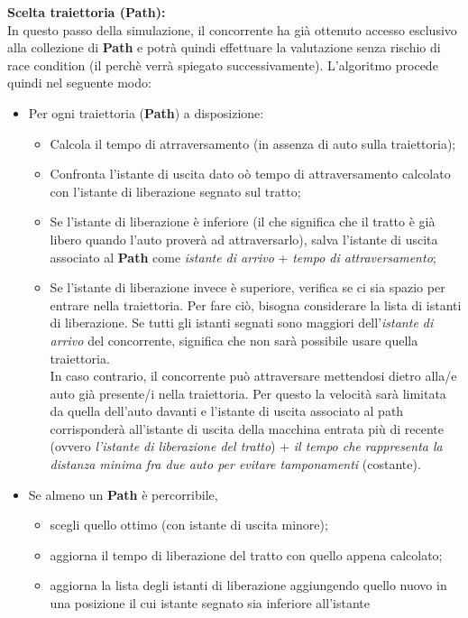 \begin{description}
\item{\textbf{Scelta traiettoria (Path):}}\\
In questo passo della simulazione, il concorrente ha già ottenuto accesso esclusivo alla collezione di \textbf{Path} e potrà quindi
effettuare la valutazione senza rischio di race condition (il perchè verrà spiegato successivamente). L'algoritmo procede quindi nel
seguente modo:
\begin{itemize}
\item Per ogni traiettoria (\textbf{Path}) a disposizione:
\begin{itemize}
\item Calcola il tempo di atrraversamento (in assenza di auto sulla traiettoria);
\item Confronta l'istante di uscita dato oò tempo di attraversamento calcolato con l'istante di liberazione
segnato sul tratto;
\item Se l'istante di liberazione è inferiore (il che significa che il tratto è già libero quando l'auto proverà ad attraversarlo),
salva l'istante di uscita associato al \textbf{Path} come \emph{istante di arrivo} + \emph{tempo di attraversamento};
\item Se l'istante di liberazione invece è superiore, verifica se ci sia spazio per entrare nella traiettoria. Per fare ciò, bisogna considerare
la lista di istanti di liberazione. Se tutti gli istanti segnati sono maggiori dell'\emph{istante di arrivo} del concorrente, significa che 
non sarà possibile usare quella traiettoria.\\
In caso contrario, il concorrente può attraversare mettendosi dietro alla/e auto già presente/i nella traiettoria. Per questo la velocità
sarà limitata da quella dell'auto davanti e l'istante di uscita associato al path 
corrisponderà all'istante di uscita della macchina entrata più di recente (ovvero
\emph{l'istante di liberazione del tratto}) + \emph{il tempo che rappresenta la distanza minima fra due auto per evitare tamponamenti} 
(costante).
\end{itemize}
\item Se almeno un \textbf{Path} è percorribile, 
\begin{itemize}
\item scegli quello ottimo (con istante di uscita minore);
\item aggiorna il tempo di liberazione del tratto con quello appena calcolato;
\item aggiorna la lista degli istanti di liberazione aggiungendo quello nuovo in una posizione il cui istante segnato sia inferiore all'istante

\end{itemize}
\end{itemize}
\end{description}
